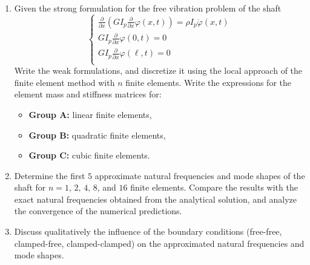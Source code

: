 \documentclass[12pt]{article}
\begin{document}
\begin{enumerate}
  \item[a)] Given the strong formulation for the free vibration problem of the shaft
        $$\begin{cases}
            \frac{\partial}{\partial x}\left(GI_p \frac{\partial}{\partial x}\varphi(x, t)\right) = \rho I_p \ddot{\varphi}(x, t) \\
            GI_p \frac{\partial}{\partial x}\varphi(0, t)=0                                                                       \\
            GI_p \frac{\partial}{\partial x}\varphi(\ell, t)=0                                                                    \\
          \end{cases}$$
        Write the weak formulations, and discretize it using the local approach of the finite element method with $n$ finite elements. Write the expressions for the element mass and stiffness matrices for:
        \begin{itemize}
          \item \textbf{Group A:} linear finite elements,
          \item \textbf{Group B:} quadratic finite elements,
          \item \textbf{Group C:} cubic finite elements.
        \end{itemize}
  \item[b)] Determine the first $5$ approximate natural frequencies and mode shapes of the shaft for $n = 1,\, 2,\, 4,\, 8$, and $16$ finite elements. Compare the results with the exact natural frequencies obtained from the analytical solution, and analyze the convergence of the numerical predictions.
  \item[c)] Discuss qualitatively the influence of the boundary conditions (free-free, clamped-free, clamped-clamped) on the approximated natural frequencies and mode shapes.
\end{enumerate}
\end{document}
